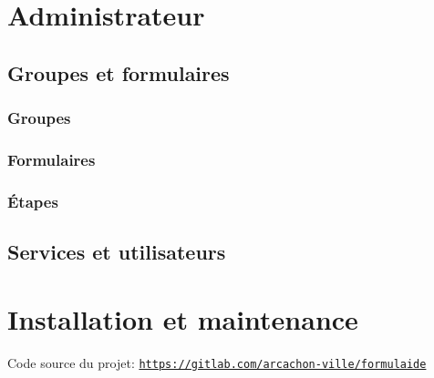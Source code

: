 \documentclass[11pt,french]{memoir}
\newcommand{\hrefs}[1]{\href{#1}{\texttt{#1}}}
\begin{document}
	\chapter{Administrateur}\label{ch:admin}


	\section{Groupes et formulaires}\label{sec:groupes-et-formulaires}

	\subsection{Groupes}\label{subsec:groupes}

	\subsection{Formulaires}\label{subsec:formulaires}

	\subsection{Étapes}\label{subsec:etapes}


	\section{Services et utilisateurs}\label{sec:services-et-utilisateurs}


	\chapter{Installation et maintenance}\label{ch:maintenance}

	\appendix
	\renewcommand{\bibname}{Références}
	\begin{thebibliography}{9}

		Code source du projet:
		\hrefs{https://gitlab.com/arcachon-ville/formulaide}

	\end{thebibliography}
\end{document}
